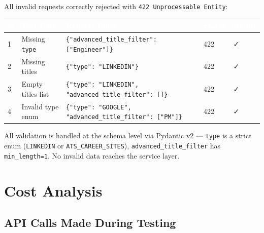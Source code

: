\documentclass[11pt, a4paper]{article}
\newcommand{\cmark}{\textcolor{success}{\faCheck}}
\begin{document}
All invalid requests correctly rejected with \texttt{422 Unprocessable Entity}:

\begin{center}\small
\begin{tabularx}{\textwidth}{|C{0.5cm}|L{3cm}|L{5.5cm}|C{1.2cm}|C{1cm}|}
\hline
{}
\textcolor{white}{\textbf{\#}} & \textcolor{white}{\textbf{Test Case}} & \textcolor{white}{\textbf{Request Body}} & \textcolor{white}{\textbf{Status}} & \textcolor{white}{\textbf{Result}} \\
 & Missing \texttt{type} & \texttt{\{"advanced\_title\_filter": ["Engineer"]\}} & 422 & \cmark \\
2 & Missing titles & \texttt{\{"type": "LINKEDIN"\}} & 422 & \cmark \\
3 & Empty titles list & \texttt{\{"type": "LINKEDIN", "advanced\_title\_filter": []\}} & 422 & \cmark \\
4 & Invalid type enum & \texttt{\{"type": "GOOGLE", "advanced\_title\_filter": ["PM"]\}} & 422 & \cmark \\
\hline
\end{tabularx}
\end{center}

\begin{infobox}
All validation is handled at the schema level via Pydantic v2 --- \texttt{type} is a strict enum (\texttt{LINKEDIN} or \texttt{ATS\_CAREER\_SITES}), \texttt{advanced\_title\_filter} has \texttt{min\_length=1}. No invalid data reaches the service layer.
\end{infobox}

\section{Cost Analysis}

\subsection{API Calls Made During Testing}
\end{document}
